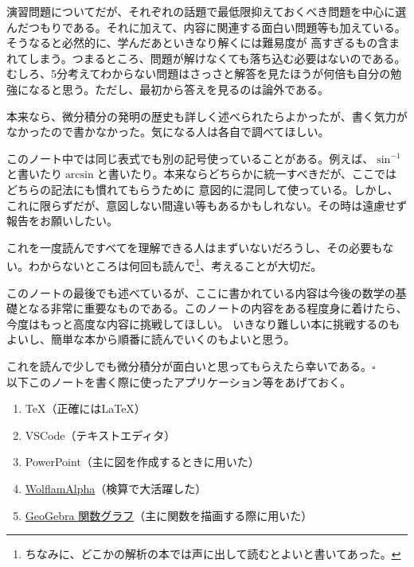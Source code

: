 \documentclass[a4j,dvipdfmx]{jsarticle}
\begin{document}
        演習問題についてだが、それぞれの話題で最低限抑えておくべき問題を中心に選んだつもりである。それに加えて、内容に関連する面白い問題等も加えている。そうなると必然的に、学んだあといきなり解くには難易度が
        高すぎるもの含まれてしまう。つまるところ、問題が解けなくても落ち込む必要はないのである。むしろ、5分考えてわからない問題はさっさと解答を見たほうが何倍も自分の勉強になると思う。ただし、最初から答えを見るのは論外である。

        本来なら、微分積分の発明の歴史も詳しく述べられたらよかったが、書く気力がなかったので書かなかった。気になる人は各自で調べてほしい。

        このノート中では同じ表式でも別の記号使っていることがある。例えば、$\sin^{-1}$と書いたり$\arcsin$と書いたり。本来ならどちらかに統一すべきだが、ここではどちらの記法にも慣れてもらうために
        意図的に混同して使っている。しかし、これに限らずだが、意図しない間違い等もあるかもしれない。その時は遠慮せず報告をお願いしたい。

        これを一度読んですべてを理解できる人はまずいないだろうし、その必要もない。わからないところは何回も読んで\footnote{ちなみに、どこかの解析の本では声に出して読むとよいと書いてあった。}、考えることが大切だ。

        このノートの最後でも述べているが、ここに書かれている内容は今後の数学の基礎となる非常に重要なものである。このノートの内容をある程度身に着けたら、今度はもっと高度な内容に挑戦してほしい。
        いきなり難しい本に挑戦するのもよいし、簡単な本から順番に読んでいくのもよいと思う。
        
        これを読んで少しでも微分積分が面白いと思ってもらえたら幸いである。$\square$\\

        以下このノートを書く際に使ったアプリケーション等をあげておく。
        \begin{enumerate}
            \item \TeX （正確には\LaTeX）
            \item VSCode（テキストエディタ）
            \item PowerPoint（主に図を作成するときに用いた）
            \item \href{https://www.wolframalpha.com/}{WolflamAlpha}（検算で大活躍した）
            \item \href{https://www.geogebra.org/graphing}{GeoGebra 関数グラフ}（主に関数を描画する際に用いた）
        \end{enumerate}

        
\end{document}
